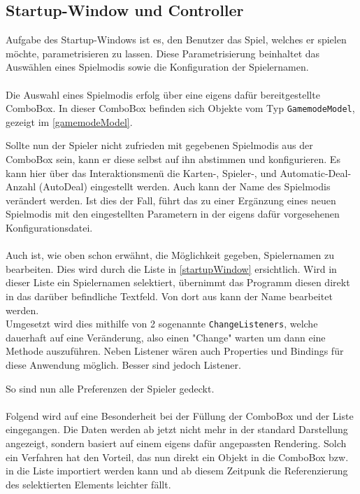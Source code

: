 \subsection{Startup-Window und Controller}\label{subsec:startupController}
Aufgabe des Startup-Windows ist es, den Benutzer das Spiel, welches er spielen möchte, parametrisieren zu lassen.
Diese Parametrisierung beinhaltet das Auswählen eines Spielmodis sowie die Konfiguration der Spielernamen.\\\\
Die Auswahl eines Spielmodis erfolg über eine eigens dafür bereitgestellte ComboBox.
In dieser ComboBox befinden sich Objekte vom Typ \lstinline[style=java]{GamemodeModel}, gezeigt im \autoref{gamemodeModel}.

Sollte nun der Spieler nicht zufrieden mit gegebenen Spielmodis aus der ComboBox sein, kann er diese selbst auf ihn abstimmen und konfigurieren.
Es kann hier über das Interaktionsmenü die Karten-, Spieler-, und Automatic-Deal-Anzahl (AutoDeal) eingestellt werden.
Auch kann der Name des Spielmodis verändert werden.
Ist dies der Fall, führt das zu einer Ergänzung eines neuen Spielmodis mit den eingestellten Parametern in der eigens dafür vorgesehenen Konfigurationsdatei.\\\\
Auch ist, wie oben schon erwähnt, die Möglichkeit gegeben, Spielernamen zu bearbeiten.
Dies wird durch die Liste in \autoref{startupWindow} ersichtlich.
Wird in dieser Liste ein Spielernamen selektiert, übernimmt das Programm diesen direkt in das darüber befindliche Textfeld.
Von dort aus kann der Name bearbeitet werden.\\
Umgesetzt wird dies mithilfe von 2 sogenannte \lstinline[style=java]{ChangeListeners}, welche dauerhaft auf eine Veränderung, also einen "Change" warten um dann eine Methode auszuführen.
Neben Listener wären auch Properties und Bindings für diese Anwendung möglich.
Besser sind jedoch Listener.

So sind nun alle Preferenzen der Spieler gedeckt.\\\\
Folgend wird auf eine Besonderheit bei der Füllung der ComboBox und der Liste eingegangen.
Die Daten werden ab jetzt nicht mehr in der standard Darstellung angezeigt, sondern basiert auf einem eigens dafür angepassten Rendering.
Solch ein Verfahren hat den Vorteil, das nun direkt ein Objekt in die ComboBox bzw. in die Liste importiert werden kann und ab diesem Zeitpunk die Referenzierung des selektierten Elements leichter fällt.
